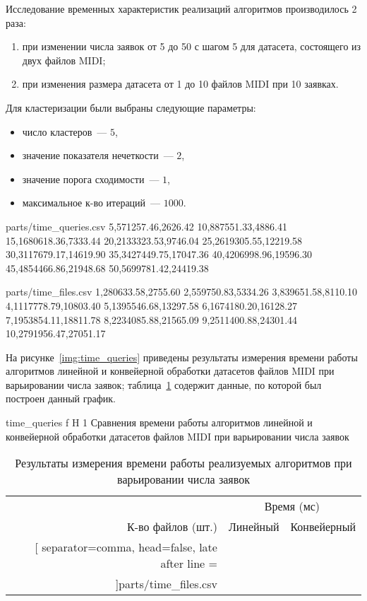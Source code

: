Исследование временных характеристик реализаций алгоритмов производилось 2 раза:
\begin{enumerate}
	\item при изменении числа заявок от 5 до 50 с шагом 5 для датасета, состоящего из двух файлов MIDI;
	\item при изменения размера датасета от 1 до 10 файлов MIDI при 10 заявках.
\end{enumerate}

Для кластеризации были выбраны следующие параметры:
\begin{itemize}
	\item число кластеров~--- $5$,
	\item значение показателя нечеткости~--- $2$,
	\item значение порога сходимости~--- $1$,
	\item максимальное к-во итераций~--- $1000$.
\end{itemize}

\begin{filecontents*}{parts/time_queries.csv}
	5,571257.46,2626.42
	10,887551.33,4886.41
	15,1680618.36,7333.44
	20,2133323.53,9746.04
	25,2619305.55,12219.58
	30,3117679.17,14619.90
	35,3427449.75,17047.36
	40,4206998.96,19596.30
	45,4854466.86,21948.68
	50,5699781.42,24419.38
\end{filecontents*}

\begin{filecontents*}{parts/time_files.csv}
	1,280633.58,2755.60
	2,559750.83,5334.26
	3,839651.58,8110.10
	4,1117778.79,10803.40
	5,1395546.68,13297.58
	6,1674180.20,16128.27
	7,1953854.11,18811.78
	8,2234085.88,21565.09
	9,2511400.88,24301.44
	10,2791956.47,27051.17
\end{filecontents*}

На рисунке~\ref{img:time_queries} приведены результаты измерения времени работы алгоритмов линейной и конвейерной обработки датасетов файлов MIDI при варьировании числа заявок; таблица~\ref{tbl:time_queries} содержит данные, по которой был построен данный график.

	{time_queries}
	{f}
	{H}
	{1\textwidth}
	{Сравнения времени работы алгоритмов линейной и конвейерной обработки датасетов файлов MIDI при варьировании числа заявок}
	
\begin{table}[H]
	\centering
	\caption{Результаты измерения времени работы реализуемых алгоритмов при варьировании числа заявок}
	\label{tbl:time_queries}
	\begin{tabular}{|r|r|r|}
		\hline
		~ & \multicolumn{2}{c|}{Время (мс)} \\
		\cline{2-3}
		К-во файлов (шт.) & Линейный & Конвейерный \\ \hline
		\csvreader[
		separator=comma,
		head=false,
		late after line = \\\hline
		]{parts/time_files.csv}{}{%
			\csvcoli & \csvcolii & \csvcoliii  
		}
	\end{tabular}
\end{table}

